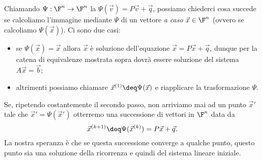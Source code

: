 Chiamando $\Psi : \F^n \to \F^n$ la  
$\Psi(\vec v) = P\vec v + \vec q$, possiamo chiederci cosa succede se calcoliamo l'immagine mediante $\Psi$ di un vettore \emph{a caso} $\vec x \in \F^n$ (ovvero se calcoliamo $\Psi(\vec x)$). Ci sono due casi: \begin{itemize}
    \item se $\Psi(\vec x) = \vec x$ allora $\vec x$ è soluzione dell'equazione $\vec x = P\vec x + \vec q$, dunque per la catena di equivalenze mostrata sopra dovrà essere soluzione del sistema $A\vec x = \vec b$;
    \item altrimenti possiamo chiamare $\vec x^{(1)} \deq \Psi(\vec x)$ e riapplicare la trasformazione $\Psi$.   
\end{itemize}

Se, ripetendo costantemente il secondo passo, non arriviamo mai ad un punto $\vec x'$ tale che $\vec x' = \Psi(\vec x')$ otterremo una successione di vettori in $\F^n$ data da \begin{equation}\label{eq:seqn_iter_method}
    \vec x^{(k+1)} \deq \Psi(\vec x^{(k)}) = P\vec x + \vec q.
\end{equation} La nostra speranza è che se questa successione converge a qualche punto, questo punto sia una soluzione della ricorrenza e quindi del sistema lineare iniziale.

